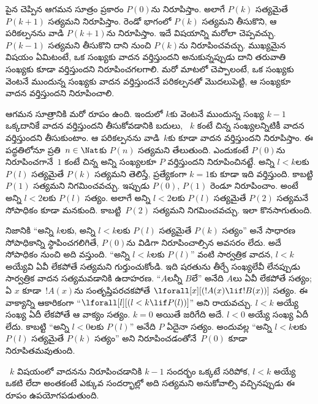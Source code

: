 \documentclass[../../../include/open-logic-section]{subfiles}
\begin{document}


పైన చెప్పిన ఆగమన సూత్రం ప్రకారం $P(0)$ను నిరూపిస్తాం.
అలాగే $P(k)$ సత్యమైతే $P(k+1)$ సత్యమని నిరూపిస్తాం.
రెండో భాగంలో $P(k)$ సత్యమని తీసుకొని, ఆ పరికల్పనను వాడి
$P(k+1)$ను నిరూపిస్తాం. ఇదే విషయాన్ని మరోలా చెప్పవచ్చు.
$P(k-1)$ సత్యమని తీసుకొని దాని నుంచి $P(k)$ను నిరూపించవచ్చు.
ముఖ్యమైన విషయం ఏమిటంటే, ఒక సంఖ్యకు వాదన వర్తిస్తుందని
అనుకున్నప్పుడు దాని తరువాతి సంఖ్యకు కూడా వర్తిస్తుందని
నిరూపించగలగాలి. మరో మాటలో చెప్పాలంటే, ఒక సంఖ్యకు
వెంటనే ముందున్న సంఖ్యకు వాదన వర్తిస్తుందనే పరికల్పనతో మొదలుపెట్టి,
ఆ సంఖ్యకూ వాదన వర్తిస్తుందని నిరూపించాలి.

ఆగమన సూత్రానికి మరో రూపం ఉంది. ఇందులో $k$కు వెంటనే ముందున్న
సంఖ్య $k-1$ ఒక్కదానికే వాదన వర్తిస్తుందని తీసుకోవడానికి బదులు,
~$k$ కంటే చిన్న సంఖ్యలన్నిటికీ వాదన వర్తిస్తుందని తీసుకుంటాం.
ఆ పరికల్పనను వాడి~$k$కు కూడా వాదన వర్తిస్తుందని నిరూపిస్తాం.
ఈ పద్ధతిలోనూ ప్రతి~$n \in
\Nat$కు $P(n)$ సత్యమని తేలుతుంది. ఎందుకంటే $P(0)$ను
నిరూపించగానే~$1$ కంటే చిన్న అన్ని సంఖ్యలకూ $P$ వర్తిస్తుందని
నిరూపించినట్టే. అన్ని $l<k$లకు $P(l)$ సత్యమైతే $P(k)$ సత్యమని
తెలిస్తే, ప్రత్యేకంగా $k=1$కు కూడా ఇది వర్తిస్తుంది. కాబట్టి
$P(1)$ సత్యమని నిగమించవచ్చు. ఇప్పుడు $P(0)$, $P(1)$ రెండూ
నిరూపించాం. అంటే అన్ని $l<2$లకు $P(l)$ సత్యం. అలాగే అన్ని
$l<2$లకు $P(l)$ సత్యమైతే $P(2)$ సత్యమనే సోపాధికం కూడా
మనకుంది. కాబట్టి~$P(2)$ సత్యమని నిగమించవచ్చు. ఇలా కొనసాగుతుంది.

నిజానికి ``అన్ని $k$లకు, అన్ని $l<k$లకు $P(l)$ సత్యమైతే $P(k)$ సత్యం'' అనే సాధారణ సోపాధికాన్ని స్థాపించగలిగితే, $P(0)$ను విడిగా నిరూపించాల్సిన అవసరం లేదు. అదే సోపాధికం నుంచి అది వస్తుంది. ``అన్ని $l<k$లకు $P(l)$'' వంటి సార్వత్రిక వాదన, $l<k$ అయ్యేవి ఏవీ లేకపోతే సత్యమని గుర్తుంచుకోండి. ఇది షరతును తీర్చే సంఖ్యలేవీ లేనప్పుడు సార్వత్రిక వాదన సత్యమవడానికి ఉదాహరణ. ``$A$లన్నీ $B$లే'' అనేది $A$లు ఏవీ లేకపోతే సత్యం; ఏ $x$ కూడా~$!A(x)$ను సంతృప్తిపరచకపోతే $\lforall[x][(!A(x) \lif !B(x))]$ సత్యం. ఈ వాక్యాన్ని ఆకారికంగా ``$\lforall[l][(l < k \lif P(l))]$'' అని
రాయవచ్చు. $l < k$ అయ్యే సంఖ్య ఏదీ లేకపోతే ఆ వాక్యం సత్యం.
$k=0$ అయితే జరిగేది అదే. $l<0$ అయ్యే సంఖ్య ఏదీ లేదు.
కాబట్టి ``అన్ని $l<0$లకు $P(l)$'' అనేది $P$ ఏదైనా సత్యం.
అందువల్ల ``అన్ని $l<k$లకు $P(l)$ సత్యమైతే $P(k)$ సత్యం'' అని
నిరూపించడంతోనే~$P(0)$ కూడా నిరూపితమవుతుంది.

~$k$ విషయంలో వాదనను నిరూపించడానికి $k-1$ సందర్భం ఒక్కటే సరిపోక, $l<k$ అయ్యే ఒకటి లేదా అంతకంటే ఎక్కువ సందర్భాల్లో అది సత్యమని అనుకోవాల్సి వచ్చినప్పుడు ఈ రూపం ఉపయోగపడుతుంది.
\end{document}
